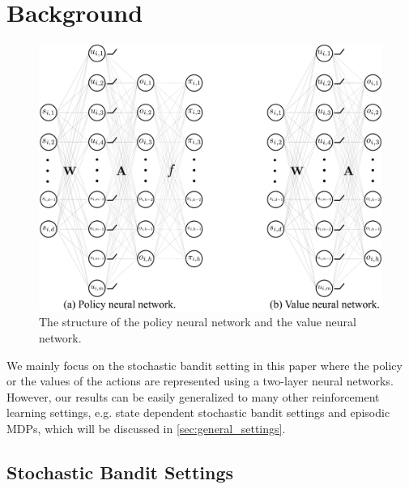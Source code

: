 \section{Background}
\label{sec:background}

\begin{figure}[t]
	\begin{center}
		\centerline{\includegraphics[width=0.8\columnwidth]{nn_policy_value_vertical.pdf}}
		\caption{The structure of the policy neural network and the value neural network.}
		\label{fig:nn_policy_value}
	\end{center}
	\vskip -0.2in
\end{figure}

We mainly focus on the stochastic bandit setting in this paper where the policy or the values of the actions are represented using a two-layer neural networks.  
However, our results can be easily generalized to many other reinforcement learning settings, e.g. state dependent stochastic bandit settings and episodic MDPs, which will be discussed in \cref{sec:general_settings}.

\subsection{Stochastic Bandit Settings}
\label{subsec:settings}

